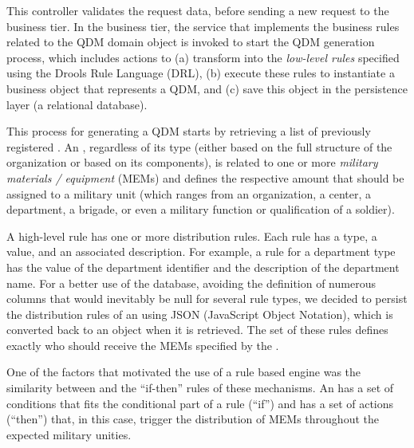 This controller validates  
the request data, before sending a new request to the business tier. In the business tier, the service 
that implements the business rules related to the QDM domain object is invoked to start the QDM generation process, 
which includes actions to (a) transform \callers into the \emph{low-level rules} specified
using the Drools Rule Language (DRL), 
(b) execute these rules to instantiate a business object that represents a QDM, and (c)
save this object in the persistence layer (a relational database). 

This process for generating a QDM starts by retrieving a list of 
previously registered \callers. An \shc, regardless of its type (either based on the 
full structure of the organization or based on its components), 
is related to one or more \emph{military materials / equipment} (MEMs) 
and defines the respective amount that should be assigned to a military 
unit (which ranges from an organization, a center, a department, a brigade, or even 
a military function or qualification of a soldier). 

A high-level rule has one or more distribution rules. Each rule has a type, 
a value, and an associated description. For example, a rule for a 
department type has the value of the department identifier and the description of 
the department name. For a better use of the database, avoiding the definition 
of numerous columns that would inevitably be null for several rule types, we decided 
to persist the distribution rules of an \shc using JSON (JavaScript Object Notation), which is 
converted back to an object when it is retrieved. The set of these rules defines 
exactly who should receive the MEMs specified by the \shc.


One of the factors that motivated the use of a rule based engine was 
the similarity between \callers and the ``if-then'' rules of these mechanisms.  
An \shc has a set of conditions that fits the conditional part of a rule (``if'') 
and has a set of actions (``then'') that, in this case, trigger the distribution 
of MEMs throughout the expected military unities.

